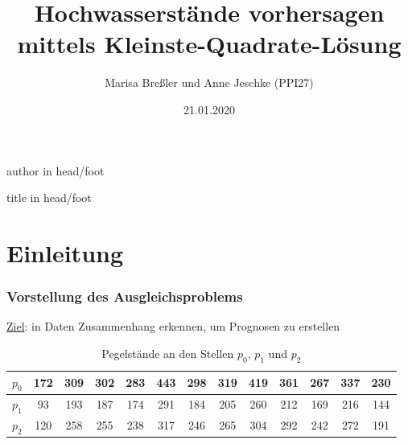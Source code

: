 \documentclass{beamer}
\title{Hochwasserstände vorhersagen mittels Kleinste-Quadrate-Lösung}
\author{Marisa Breßler und Anne Jeschke (PPI27)}
\date{21.01.2020}
\begin{document}
{%
\begin{beamercolorbox}[wd=0.5\textwidth,ht=3ex,dp=1.5ex,leftskip=.5em,rightskip=.5em]{author in head/foot}%
%
\insertframenumber\hfill\insertshortauthor%
\end{beamercolorbox}%
\vspace*{-4.5ex}\hspace*{0.5\textwidth}%
\begin{beamercolorbox}[wd=0.5\textwidth,ht=3ex,dp=1.5ex,left,leftskip=.5em]{title in head/foot}%
%
\insertshorttitle%
\end{beamercolorbox}%
}

\maketitle
\frame{\tableofcontents}

\section{Einleitung}
\begin{frame} %
  \frametitle{Vorstellung des Ausgleichsproblems} %

  \underline{Ziel}: in Daten Zusammenhang erkennen, um Prognosen zu erstellen

  \begin{table}
    \centering
    \tabcolsep=0.11cm
    \begin{tabular}{c|cccccccccccc}
      $p_0$ & 172 & 309 & 302 & 283 & 443 & 298 & 319 & 419 & 361 & 267 & 337 & 230 \\ \hline
      $p_1$ & 93 & 193 & 187 & 174 & 291 & 184 & 205 & 260 & 212 & 169 & 216 & 144 \\ \hline
      $p_2$ & 120 & 258 & 255 & 238 & 317 & 246 & 265 & 304 & 292 & 242 & 272 & 191
    \end{tabular}
  \caption{Pegelstände an den Stellen $p_0$, $p_1$ und $p_2$}
  \end{table}
\end{frame}
\end{document}
